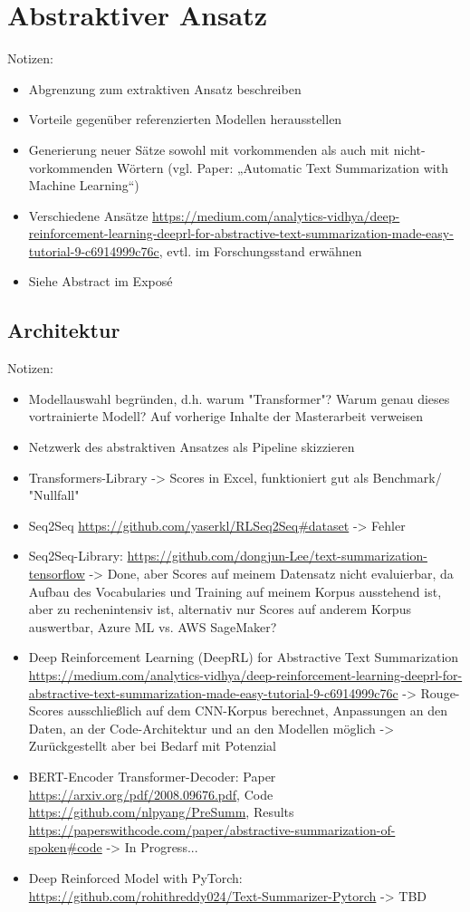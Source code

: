 \chapter{Abstraktiver Ansatz}
\thispagestyle{fancy}
\label{chap:Abstraktiver Ansatz}

Notizen:
\begin{itemize}
	\item Abgrenzung zum extraktiven Ansatz beschreiben
	\item Vorteile gegenüber referenzierten Modellen herausstellen
	\item Generierung neuer Sätze sowohl mit vorkommenden als auch mit nicht-vorkommenden Wörtern (vgl. Paper: „Automatic Text Summarization with Machine Learning“)
	\item Verschiedene Ansätze \url{https://medium.com/analytics-vidhya/deep-reinforcement-learning-deeprl-for-abstractive-text-summarization-made-easy-tutorial-9-c6914999c76c}, evtl. im Forschungsstand erwähnen
	\item Siehe Abstract im Exposé
\end{itemize}


\section{Architektur}
Notizen:
\begin{itemize}
	\item Modellauswahl begründen, d.h. warum "Transformer"? Warum genau dieses vortrainierte Modell? Auf vorherige Inhalte der Masterarbeit verweisen
	\item Netzwerk des abstraktiven Ansatzes als Pipeline skizzieren
	\item Transformers-Library -> Scores in Excel, funktioniert gut als Benchmark/ "Nullfall"
	\item Seq2Seq \url{https://github.com/yaserkl/RLSeq2Seq#dataset} -> Fehler
	\item Seq2Seq-Library: \url{https://github.com/dongjun-Lee/text-summarization-tensorflow} -> Done, aber Scores auf meinem Datensatz nicht evaluierbar, da Aufbau des Vocabularies und Training auf meinem Korpus ausstehend ist, aber zu rechenintensiv ist, alternativ nur Scores auf anderem Korpus auswertbar, Azure ML vs. AWS SageMaker?
	\item Deep Reinforcement Learning (DeepRL) for Abstractive Text Summarization \url{https://medium.com/analytics-vidhya/deep-reinforcement-learning-deeprl-for-abstractive-text-summarization-made-easy-tutorial-9-c6914999c76c} -> Rouge-Scores ausschließlich auf dem CNN-Korpus berechnet, Anpassungen an den Daten, an der Code-Architektur und an den Modellen möglich -> Zurückgestellt aber bei Bedarf mit Potenzial
	\item BERT-Encoder Transformer-Decoder: Paper \url{https://arxiv.org/pdf/2008.09676.pdf}, Code \url{https://github.com/nlpyang/PreSumm}, Results \url{https://paperswithcode.com/paper/abstractive-summarization-of-spoken#code} -> In Progress...
	\item Deep Reinforced Model with PyTorch: \url{https://github.com/rohithreddy024/Text-Summarizer-Pytorch} -> TBD
\end{itemize}


